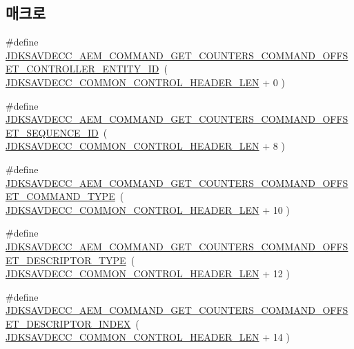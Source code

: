 \subsection*{매크로}
\begin{DoxyCompactItemize}
\item 
\#define \hyperlink{group__command__get__counters_ga3ebc2d89cf70d97a9906f7020a98df42}{J\+D\+K\+S\+A\+V\+D\+E\+C\+C\+\_\+\+A\+E\+M\+\_\+\+C\+O\+M\+M\+A\+N\+D\+\_\+\+G\+E\+T\+\_\+\+C\+O\+U\+N\+T\+E\+R\+S\+\_\+\+C\+O\+M\+M\+A\+N\+D\+\_\+\+O\+F\+F\+S\+E\+T\+\_\+\+C\+O\+N\+T\+R\+O\+L\+L\+E\+R\+\_\+\+E\+N\+T\+I\+T\+Y\+\_\+\+ID}~( \hyperlink{group__jdksavdecc__avtp__common__control__header_gaae84052886fb1bb42f3bc5f85b741dff}{J\+D\+K\+S\+A\+V\+D\+E\+C\+C\+\_\+\+C\+O\+M\+M\+O\+N\+\_\+\+C\+O\+N\+T\+R\+O\+L\+\_\+\+H\+E\+A\+D\+E\+R\+\_\+\+L\+EN} + 0 )
\item 
\#define \hyperlink{group__command__get__counters_ga8566be0333e42db8708406ba924b3a5f}{J\+D\+K\+S\+A\+V\+D\+E\+C\+C\+\_\+\+A\+E\+M\+\_\+\+C\+O\+M\+M\+A\+N\+D\+\_\+\+G\+E\+T\+\_\+\+C\+O\+U\+N\+T\+E\+R\+S\+\_\+\+C\+O\+M\+M\+A\+N\+D\+\_\+\+O\+F\+F\+S\+E\+T\+\_\+\+S\+E\+Q\+U\+E\+N\+C\+E\+\_\+\+ID}~( \hyperlink{group__jdksavdecc__avtp__common__control__header_gaae84052886fb1bb42f3bc5f85b741dff}{J\+D\+K\+S\+A\+V\+D\+E\+C\+C\+\_\+\+C\+O\+M\+M\+O\+N\+\_\+\+C\+O\+N\+T\+R\+O\+L\+\_\+\+H\+E\+A\+D\+E\+R\+\_\+\+L\+EN} + 8 )
\item 
\#define \hyperlink{group__command__get__counters_gab0930c1b82d76ce49090914a43810120}{J\+D\+K\+S\+A\+V\+D\+E\+C\+C\+\_\+\+A\+E\+M\+\_\+\+C\+O\+M\+M\+A\+N\+D\+\_\+\+G\+E\+T\+\_\+\+C\+O\+U\+N\+T\+E\+R\+S\+\_\+\+C\+O\+M\+M\+A\+N\+D\+\_\+\+O\+F\+F\+S\+E\+T\+\_\+\+C\+O\+M\+M\+A\+N\+D\+\_\+\+T\+Y\+PE}~( \hyperlink{group__jdksavdecc__avtp__common__control__header_gaae84052886fb1bb42f3bc5f85b741dff}{J\+D\+K\+S\+A\+V\+D\+E\+C\+C\+\_\+\+C\+O\+M\+M\+O\+N\+\_\+\+C\+O\+N\+T\+R\+O\+L\+\_\+\+H\+E\+A\+D\+E\+R\+\_\+\+L\+EN} + 10 )
\item 
\#define \hyperlink{group__command__get__counters_gaf358c2a51ce4e35d7c49ceda59421762}{J\+D\+K\+S\+A\+V\+D\+E\+C\+C\+\_\+\+A\+E\+M\+\_\+\+C\+O\+M\+M\+A\+N\+D\+\_\+\+G\+E\+T\+\_\+\+C\+O\+U\+N\+T\+E\+R\+S\+\_\+\+C\+O\+M\+M\+A\+N\+D\+\_\+\+O\+F\+F\+S\+E\+T\+\_\+\+D\+E\+S\+C\+R\+I\+P\+T\+O\+R\+\_\+\+T\+Y\+PE}~( \hyperlink{group__jdksavdecc__avtp__common__control__header_gaae84052886fb1bb42f3bc5f85b741dff}{J\+D\+K\+S\+A\+V\+D\+E\+C\+C\+\_\+\+C\+O\+M\+M\+O\+N\+\_\+\+C\+O\+N\+T\+R\+O\+L\+\_\+\+H\+E\+A\+D\+E\+R\+\_\+\+L\+EN} + 12 )
\item 
\#define \hyperlink{group__command__get__counters_ga415d576ca1be675a11bcab093c320a74}{J\+D\+K\+S\+A\+V\+D\+E\+C\+C\+\_\+\+A\+E\+M\+\_\+\+C\+O\+M\+M\+A\+N\+D\+\_\+\+G\+E\+T\+\_\+\+C\+O\+U\+N\+T\+E\+R\+S\+\_\+\+C\+O\+M\+M\+A\+N\+D\+\_\+\+O\+F\+F\+S\+E\+T\+\_\+\+D\+E\+S\+C\+R\+I\+P\+T\+O\+R\+\_\+\+I\+N\+D\+EX}~( \hyperlink{group__jdksavdecc__avtp__common__control__header_gaae84052886fb1bb42f3bc5f85b741dff}{J\+D\+K\+S\+A\+V\+D\+E\+C\+C\+\_\+\+C\+O\+M\+M\+O\+N\+\_\+\+C\+O\+N\+T\+R\+O\+L\+\_\+\+H\+E\+A\+D\+E\+R\+\_\+\+L\+EN} + 14 )

\end{DoxyCompactItemize}
